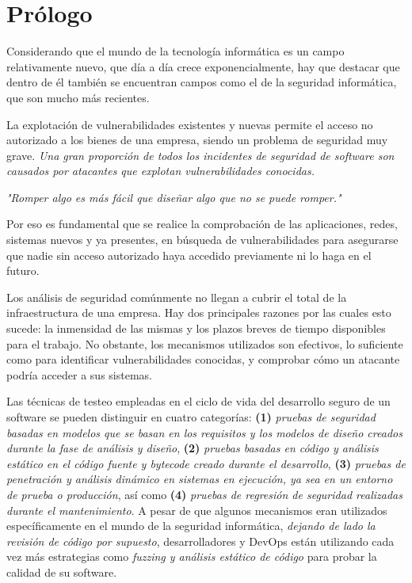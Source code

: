 \section{Prólogo}
Considerando que el mundo de la tecnología informática es un campo relativamente nuevo, que día a día crece exponencialmente, hay que destacar que dentro de él también se encuentran campos como el de la seguridad informática, que son mucho más recientes.

La explotación de vulnerabilidades existentes y nuevas permite el acceso no autorizado a los bienes de una empresa, siendo un problema de seguridad muy grave. \textit{Una gran proporción de todos los incidentes de seguridad de software son causados por atacantes que explotan vulnerabilidades conocidas.}\cite{sectesting}

\begin{displayquote}
\textit{"Romper algo es más fácil que diseñar algo que no se puede romper."}
\end{displayquote}

Por eso es fundamental que se realice la comprobación de las aplicaciones, redes, sistemas nuevos y ya presentes, en búsqueda de vulnerabilidades para asegurarse que nadie sin acceso autorizado haya accedido previamente ni lo haga en el futuro. 

Los análisis de seguridad comúnmente no llegan a cubrir el total de la infraestructura de una empresa. Hay dos principales razones por las cuales esto sucede: la inmensidad de las mismas y los plazos breves de tiempo disponibles para el trabajo\cite{krypsys}\cite{specopssoft}\cite{crest}\cite{notsosecure}. No obstante, los mecanismos utilizados son efectivos, lo suficiente como para identificar vulnerabilidades conocidas, y comprobar cómo un atacante podría acceder a sus sistemas.

Las técnicas de testeo empleadas en el ciclo de vida del desarrollo seguro de un software se pueden distinguir en cuatro categorías: \textbf{(1)} \textit{pruebas de seguridad basadas en modelos que se basan en los requisitos y los modelos de diseño creados durante la fase de análisis y diseño}, \textbf{(2)} \textit{pruebas basadas en código y análisis estático en el código fuente y bytecode creado durante el desarrollo}, \textbf{(3)} \textit{pruebas de penetración y análisis dinámico en sistemas en ejecución, ya sea en un entorno de prueba o producción}, así como \textbf{(4)} \textit{pruebas de regresión de seguridad realizadas durante el mantenimiento}\cite{sectesting}.
A pesar de que algunos mecanismos eran utilizados específicamente en el mundo de la seguridad informática, \textit{dejando de lado la revisión de código por supuesto}, desarrolladores y DevOps están utilizando cada vez más estrategias como \textit{fuzzing y análisis estático de código} para probar la calidad de su software\cite{accelerate_report}\cite{concepts}.

